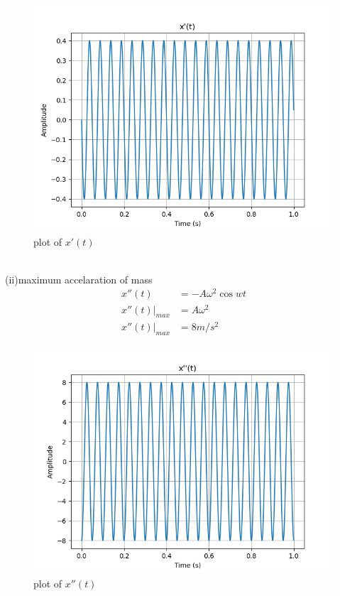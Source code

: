 \documentclass[journal,12pt,twocolumn]{IEEEtran}
\theoremstyle{remark}
\begin{document}
\begin{figure}[h!]
    \centering
    \includegraphics[width=1.1\linewidth]{figs/analog2.png}
    \caption{plot of $x'(t)$}
\end{figure}\\
(ii)maximum accelaration of mass\\
\begin{align}
   x''(t)&=-A\omega^2 \cos{wt}\\
    x''(t)\Bigr|_{max}&=A\omega^2\\
    x''(t)\Bigr|_{max}&=8m/s^2
\end{align}
\begin{figure}[h!]
    \centering
    \includegraphics[width=1.1\linewidth]{figs/analog3.png}
    \caption{plot of $x''(t)$}
\end{figure}
\end{document}
